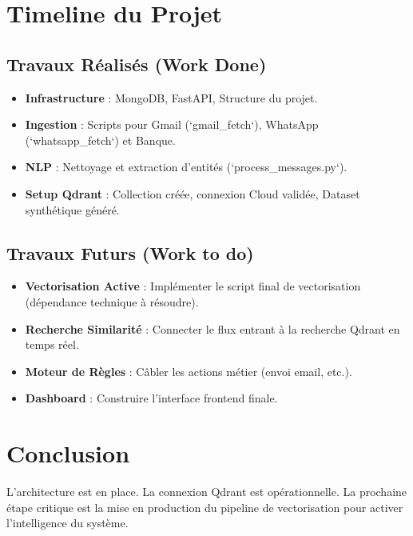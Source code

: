 \documentclass[11pt,a4paper]{article}
\begin{document}
\section{Timeline du Projet}

\subsection{Travaux Réalisés (Work Done)}
\begin{itemize}
    \item[$\checkmark$] \textbf{Infrastructure} : MongoDB, FastAPI, Structure du projet.
    \item[$\checkmark$] \textbf{Ingestion} : Scripts pour Gmail (`gmail\_fetch`), WhatsApp (`whatsapp\_fetch`) et Banque.
    \item[$\checkmark$] \textbf{NLP} : Nettoyage et extraction d'entités (`process\_messages.py`).
    \item[$\checkmark$] \textbf{Setup Qdrant} : Collection créée, connexion Cloud validée, Dataset synthétique généré.
\end{itemize}

\subsection{Travaux Futurs (Work to do)}
\begin{itemize}
    \item[$\square$] \textbf{Vectorisation Active} : Implémenter le script final de vectorisation (dépendance technique à résoudre).
    \item[$\square$] \textbf{Recherche Similarité} : Connecter le flux entrant à la recherche Qdrant en temps réel.
    \item[$\square$] \textbf{Moteur de Règles} : Câbler les actions métier (envoi email, etc.).
    \item[$\square$] \textbf{Dashboard} : Construire l'interface frontend finale.
\end{itemize}

\section{Conclusion}
L'architecture est en place. La connexion Qdrant est opérationnelle. La prochaine étape critique est la mise en production du pipeline de vectorisation pour activer l'intelligence du système.
\end{document}

